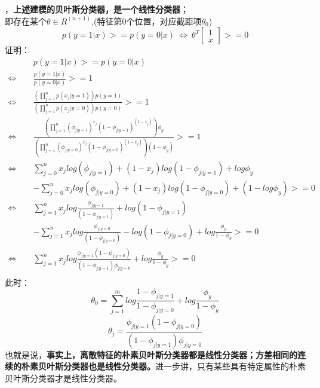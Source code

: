 ，\textbf{上述建模的贝叶斯分类器，是一个线性分类器}；\\即存在某个$\theta\in R^{(n+1)}$,(特征第0个位置，对应截距项$\theta_0$)
$$p(y=1|x)>=p(y=0|x)~\Leftrightarrow~\theta^T \begin{bmatrix}
   1  \\
   x
  \end{bmatrix}>=0$$
证明：
\begin{equation}\nonumber
\begin{split}
  &p(y=1|x)>=p(y=0|x)\\
  \Leftrightarrow&\frac{p(y=1|x)}{p(y=0|x)}>=1\\
  \Leftrightarrow&\frac{(\prod_{j=1}^{n}p(x_j|y=1))p(y=1)}{(\prod_{j=1}^{n}p(x_j|y=0))p(y=0)}>=1\\
  \Leftrightarrow&\frac{(\prod_{j=1}^{n}(\phi_{j|y=1})^{x_j}(1-\phi_{j|y=1})^{(1-x_j)})\phi_y}{(\prod_{j=1}^{n}(\phi_{j|y=0})^{x_j}(1-\phi_{j|y=0})^{(1-x_j)})(1-\phi_y)}>=1\\
  \Leftrightarrow&\sum_{j=0}^{n}x_j log(\phi_{j|y=1})+(1-x_j)log(1-\phi_{j|y=1})+log\phi_y\\
  ~~~~~~~~~~&-\sum_{j=0}^{n} x_j log(\phi_{j|y=0})+(1-x_j)log(1-\phi_{j|y=0})+(1-log\phi_y)>=0\\
  \Leftrightarrow&\sum_{j=1}^{n}x_jlog\frac{\phi_{j|y=1}}{(1-\phi_{j|y=1})}+log(1-\phi_{j|y=1})\\
  ~~~~~~~~~~&-\sum_{j=1}^{n}x_jlog\frac{\phi_{j|y=0}}{(1-\phi_{j|y=0})}-log(1-\phi_{j|y=0})+log\frac{\phi_y}{1-\phi_y}>=0\\
  \Leftrightarrow&\sum_{j=1}^{n}x_jlog\frac{\phi_{j|y=1}(1-\phi_{j|y=0})}{(1-\phi_{j|y=1})\phi_{j|y=0}}+log\frac{\phi_y}{1-\phi_y}>=0\\
\end{split}
\end{equation}
此时：$$\theta_0 = \sum_{j=1}^{m} log\frac{1-\phi_{j|y=1}}{1-\phi_{j|y=0}}+log\frac{\phi_y}{1-\phi_y}$$
$$\theta_j=\frac{\phi_{j|y=1}(1-\phi_{j|y=0})}{(1-\phi_{j|y=1})\phi_{j|y=0}}$$
也就是说，{\color{red}{我们拿一个新数据x代入模型测试，利用我们上面得到的线性分类器$\theta^Tx$，与利在朴素贝叶斯比较$p(y=1|x)$与$p(y=0|x)$是等效的。}}\textbf{事实上，离散特征的朴素贝叶斯分类器都是线性分类器；方差相同的连续的朴素贝叶斯分类器也是线性分类器。}进一步讲，只有某些具有特定属性的朴素贝叶斯分类器才是线性分类器。

